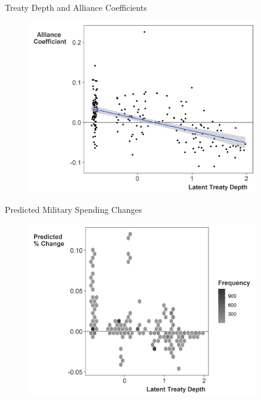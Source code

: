 \documentclass[12pt]{beamer}
\begin{document}

\begin{frame}{Treaty Depth and Alliance Coefficients}

\begin{figure}
	\centering
		\includegraphics[width=0.9\textwidth]{ld-lambda-min.png}
	\label{fig:ld-lambda-min}
\end{figure}


\end{frame}


\begin{frame}{Predicted Military Spending Changes}

\begin{figure}
	\centering
		\includegraphics[width=0.9\textwidth]{ld-growth-min.png}
\end{figure}


\end{frame}
\end{document}
